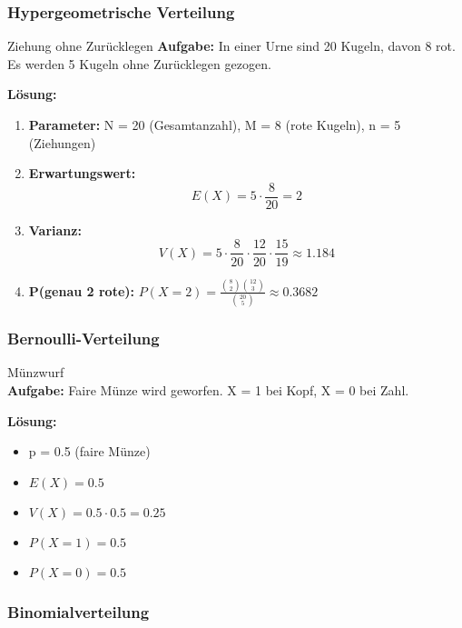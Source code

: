 \subsubsection{Hypergeometrische Verteilung}

\begin{example}{Ziehung ohne Zurücklegen}
\textbf{Aufgabe:} In einer Urne sind 20 Kugeln, davon 8 rot. Es werden 5 Kugeln ohne Zurücklegen gezogen. 

\textbf{Lösung:}
\begin{enumerate}
\item \textbf{Parameter:} N = 20 (Gesamtanzahl), M = 8 (rote Kugeln), n = 5 (Ziehungen)

\item \textbf{Erwartungswert:}
   $$E(X) = 5 \cdot \frac{8}{20} = 2$$

\item \textbf{Varianz:}
   $$V(X) = 5 \cdot \frac{8}{20} \cdot \frac{12}{20} \cdot \frac{15}{19} \approx 1.184$$

\item \textbf{P(genau 2 rote):}
   $P(X=2) = \frac{\binom{8}{2}\binom{12}{3}}{\binom{20}{5}} \approx 0.3682$
\end{enumerate}
\end{example}

\columnbreak


\subsubsection{Bernoulli-Verteilung}

\begin{example}{Münzwurf}\\
\textbf{Aufgabe:} Faire Münze wird geworfen. X = 1 bei Kopf, X = 0 bei Zahl.

\textbf{Lösung:}
\begin{itemize}
\item p = 0.5 (faire Münze)
\item $E(X) = 0.5$
\item $V(X) = 0.5 \cdot 0.5 = 0.25$
\item $P(X=1) = 0.5$
\item $P(X=0) = 0.5$
\end{itemize}
\end{example}

\subsubsection{Binomialverteilung}

